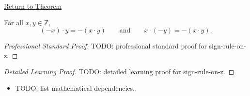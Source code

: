 \newpage
{}
\label{prf:sign-rule-on-z}

\begin{remark*}[Return]
\hyperref[cor:sign-rule-on-z]{Return to Theorem}
\end{remark*}

\begin{corollary*}
For all $x,y\in\mathbb{Z}$,
\[
(-x)\cdot y=-(x\cdot y)
\qquad\text{and}\qquad
x\cdot(-y)=-(x\cdot y).
\]
\end{corollary*}

\begin{proof}[Professional Standard Proof]
\LRAProofBodyStart
TODO: professional standard proof for sign-rule-on-z.
\end{proof}

\begin{proof}[Detailed Learning Proof]
\LRAProofBodyStart
TODO: detailed learning proof for sign-rule-on-z.
\end{proof}

\begin{remark*}
\end{remark*}

\begin{dependencies}
\begin{itemize}
  \item TODO: list mathematical dependencies.
\end{itemize}
\end{dependencies}

\clearpage
